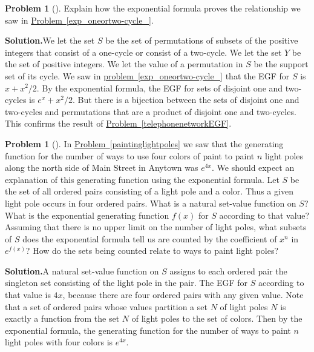 \documentclass[10pt,]{book}
\theoremstyle{plain}
\theoremstyle{definition}
\newtheorem{activity}[project]{Problem}
\theoremstyle{definition}
\numberwithin{equation}{chapter}
\begin{document}
\begin{activity}[]\label{activity-416}
Explain how the exponential formula proves the relationship we saw in \hyperref[exp_oneortwo-cycle_]{Problem~\ref{exp_oneortwo-cycle_}}.%
\par\medskip\noindent%
\textbf{Solution.}\quad We let the set \(S\) be the set of permutations of subsets of the positive integers that consist of a one-cycle or consist of a two-cycle. We let the set \(Y\) be the set of positive integers. We let the value of a permutation in \(S\) be the support set of its cycle. We saw in \hyperref[exp_oneortwo-cycle_]{problem~\ref{exp_oneortwo-cycle_}} that the EGF for \(S\) is \(x+x^2/2\). By the exponential formula, the EGF for sets of disjoint one and two-cycles is \(e^x+x^2/2\). But there is a bijection between the sets of disjoint one and two-cycles and permutations that are a product of disjoint one and two-cycles. This confirms the result of \hyperref[telephonenetworkEGF]{Problem~\ref{telephonenetworkEGF}}.%
\end{activity}
\begin{activity}[]\label{activity-417}
In \hyperref[paintinglightpoles]{Problem~\ref{paintinglightpoles}} we saw that the generating function for the number of ways to use four colors of paint to paint \(n\) light poles along the north side of Main Street in Anytown was \(e^{4x}\). We should expect an explanation of this generating function using the exponential formula. Let \(S\) be the set of all ordered pairs consisting of a light pole and a color. Thus a given light pole occurs in four ordered pairs. What is a natural set-value function on \(S\)? What is the exponential generating function \(f(x)\) for \(S\) according to that value? Assuming that there is no upper limit on the number of light poles, what subsets of \(S\) does the exponential formula tell us are counted by the coefficient of \(x^n\) in \(e^{f(x)}\)? How do the sets being counted relate to ways to paint light poles?%
\par\medskip\noindent%
\textbf{Solution.}\quad A natural set-value function on \(S\) assigns to each ordered pair the singleton set consisting of the light pole in the pair. The EGF for \(S\) according to that value is \(4x\), because there are four ordered pairs with any given value. Note that a set of ordered pairs whose values partition a set \(N\) of light poles \(N\) is exactly a function from the set \(N\) of light poles to the set of colors. Then by the exponential formula, the generating function for the number of ways to paint \(n\) light poles with four colors is \(e^{4x}\).%
\end{activity}
\end{document}
